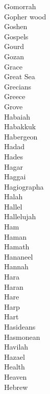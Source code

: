 Gomorrah  \\
Gopher wood  \\
Goshen  \\
Gospels  \\
Gourd  \\
Gozan  \\
Grace  \\
Great Sea  \\
Grecians  \\
Greece  \\
Grove  \\
Habaiah  \\
Habakkuk  \\
Habergeon  \\
Hadad  \\
Hades  \\
Hagar  \\
Haggai  \\
Hagiographa  \\
Halah  \\
Hallel  \\
Hallelujah  \\
Ham  \\
Haman  \\
Hamath  \\
Hananeel  \\
Hannah  \\
Hara  \\
Haran  \\
Hare  \\
Harp  \\
Hart  \\
Hasideans  \\
Hasmonean  \\
Havilah  \\
Hazael  \\
Health  \\
Heaven  \\
Hebrew  \\
